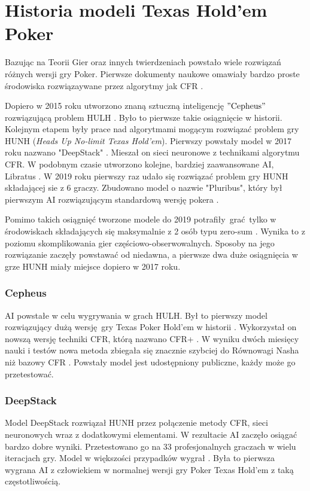 \documentclass[12pt,oneside,a4paper]{report}
\begin{document}
\section{Historia modeli Texas Hold'em Poker}

Bazując na Teorii Gier oraz innych twierdzeniach powstało wiele rozwiązań różnych wersji gry Poker.
Pierwsze dokumenty naukowe omawiały bardzo proste
środowiska rozwiązaywane przez algorytmy jak CFR \cite{DCFR}.


Dopiero w 2015 roku utworzono znaną sztuczną inteligencję $"\text{Cepheus}"$ rozwiązującą problem
HULH \cite{cepheus}. Było to pierwsze takie osiągnięcie w historii. Kolejnym etapem były prace nad
algorytmami mogącym rozwiązać problem gry HUNH (\emph{Heads Up No-limit Texas Hold'em}).
Pierwszy powstały model w 2017 roku nazwano "DeepStack" \cite{ds}. Mieszał on sieci neuronowe z 
technikami algorytmu CFR. W podobnym czasie utworzono kolejne, bardziej zaawansowane AI,
Libratus \cite{libratus}. W 2019 roku pierwszy raz udało się rozwiązać 
problem gry HUNH składającej sie z 6 graczy. Zbudowano model o nazwie "Pluribus", który był
pierwszym AI
rozwiązującym standardową wersję pokera \cite{Pluribus}.


Pomimo takich osiągnięć tworzone modele do 2019 potrafiły grać tylko
w środowiskach 
składających się maksymalnie z 2 osób typu zero-sum \cite{libratus} \cite{cepheus} \cite{ds}.  
Wynika to z poziomu skomplikowania gier częściowo-obserwowalnych.
Sposoby na jego rozwiązanie zaczęły powstawać od niedawna, a pierwsze
dwa duże osiągnięcia w grze HUNH miały miejsce dopiero w 2017 roku.


\subsubsection{Cepheus}

AI powstałe w celu wygrywania w grach HULH. Był to pierwszy model rozwiązujący dużą wersję gry Texas
Poker Hold'em w historii \cite{cepheus}.  Wykorzystał on nowszą wersję techniki CFR, którą nazwano CFR+
\cite{cepheus}. W wyniku dwóch miesięcy nauki i testów nowa metoda zbiegała się znacznie szybciej do
Równowagi Nasha niż bazowy CFR \cite{cepheus}. Powstały model jest udostępniony publiczne, każdy
może go przetestować.    

\subsubsection{DeepStack}

Model DeepStack rozwiązał HUNH przez połączenie metody CFR, sieci neuronowych wraz z dodatkowymi
elementami. W rezultacie AI zaczęło osiągać bardzo dobre wyniki.
Przetestowano go na 33 profesjonalnych graczach w wielu iteracjach gry. Model w większości
przypadków wygrał \cite{ds}. Była to pierwsza wygrana AI z człowiekiem w normalnej 
wersji gry Poker Texas Hold'em z taką częstotliwością.
\end{document}

